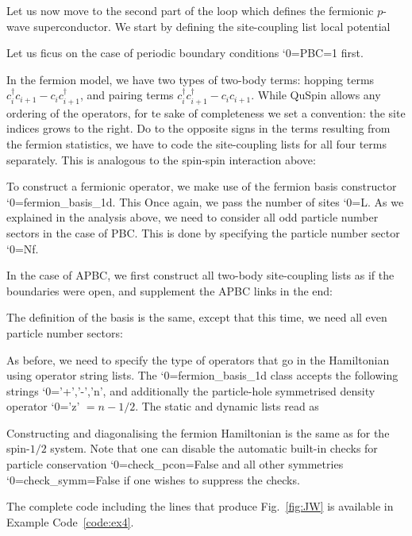 \documentclass{SciPost}
\newcommand\0{\scalebox{-1}[1]{0}}
\let\svttfamily\ttfamily
\renewcommand\ttfamily{\svttfamily\catcode`0=\active }
\renewcommand\texttt{\bgroup\ttfamily\texttthelp}
\def\texttthelp#1{#1\egroup}
\newcommand{\JWcode}{example6.py}
\begin{document}
Let us now move to the second part of the loop which defines the fermionic $p$-wave superconductor. We start by defining the site-coupling list local potential

Let us ficus on the case of periodic boundary conditions \texttt{PBC=1} first. 

In the fermion model, we have two types of two-body terms: hopping terms $c^\dagger_{i}c_{i+1} - c_{i}c^\dagger_{i+1}$, and pairing terms $c^\dagger_{i}c^\dagger_{i+1} - c_{i}c_{i+1}$. While QuSpin allows any ordering of the operators, for te sake of completeness we set a convention: the site indices grows to the right. Do to the opposite signs in the terms resulting from the fermion statistics, we have to code the site-coupling lists for all four terms separately. This is analogous to the spin-spin interaction above:

To construct a fermionic operator, we make use of the fermion basis constructor \texttt{fermion\_basis\_1d}. This Once again, we pass the number of sites \texttt{L}. As we explained in the analysis above, we need to consider all odd particle number sectors in the case of PBC. This is done by specifying the particle number sector \texttt{Nf}. 


In the case of APBC, we first construct all two-body site-coupling lists as if the boundaries were open, and supplement the APBC links in the end:

The definition of the basis is the same, except that this time, we need all even particle number sectors:


As before, we need to specify the type of operators that go in the Hamiltonian using operator string lists. The \texttt{fermion\_basis\_1d} class accepts the following strings \texttt{'+','-','n'}, and additionally the particle-hole symmetrised density operator \texttt{'z'} $=n-1/2$. The static and dynamic lists read as

Constructing and diagonalising the fermion Hamiltonian is the same as for the spin-$1/2$ system. Note that one can disable the automatic built-in checks for particle conservation \texttt{check\_pcon=False} and all other symmetries \texttt{check\_symm=False} if one wishes to suppress the checks. 


The complete code including the lines that produce Fig.~\ref{fig:JW} is available in Example Code~\ref{code:ex4}.
\end{document}
